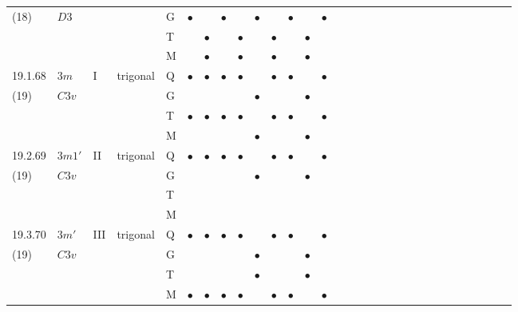 \documentclass[fleqn,9pt,landscape]{jsarticle}
\begin{document}
\begin{longtable}{lllll|l|l|l|l|l|l|l|l|l|ll|ll|ll|ll|ll|ll|ll|ll}
(18) & $D3$ &  &  & G & $\bullet$ &  & $\bullet$ &  & $\bullet$ &  & $\bullet$ &  & $\bullet$ &  &  &  &  &  &  &  &  &  &  &  &  &  &  &  &  \\
 &  &  &  & T &  & $\bullet$ &  & $\bullet$ &  & $\bullet$ &  & $\bullet$ &  &  &  &  &  &  &  &  &  &  &  &  &  &  &  &  &  \\
 &  &  &  & M &  & $\bullet$ &  & $\bullet$ &  & $\bullet$ &  & $\bullet$ &  &  &  &  &  &  &  &  &  &  &  &  &  &  &  &  &  \\ \hline
19.1.68 & \texttt{$3m$} & I & trigonal & Q & $\bullet$ & $\bullet$ & $\bullet$ & $\bullet$ &  & $\bullet$ & $\bullet$ &  & $\bullet$ &  &  &  &  &  &  &  &  &  &  &  &  &  &  &  &  \\
(19) & $C3v$ &  &  & G &  &  &  &  & $\bullet$ &  &  & $\bullet$ &  &  &  &  &  &  &  &  &  &  &  &  &  &  &  &  &  \\
 &  &  &  & T & $\bullet$ & $\bullet$ & $\bullet$ & $\bullet$ &  & $\bullet$ & $\bullet$ &  & $\bullet$ &  &  &  &  &  &  &  &  &  &  &  &  &  &  &  &  \\
 &  &  &  & M &  &  &  &  & $\bullet$ &  &  & $\bullet$ &  &  &  &  &  &  &  &  &  &  &  &  &  &  &  &  &  \\ \hline
19.2.69 & \texttt{$3m1'$} & II & trigonal & Q & $\bullet$ & $\bullet$ & $\bullet$ & $\bullet$ &  & $\bullet$ & $\bullet$ &  & $\bullet$ &  &  &  &  &  &  &  &  &  &  &  &  &  &  &  &  \\
(19) & $C3v$ &  &  & G &  &  &  &  & $\bullet$ &  &  & $\bullet$ &  &  &  &  &  &  &  &  &  &  &  &  &  &  &  &  &  \\
 &  &  &  & T &  &  &  &  &  &  &  &  &  &  &  &  &  &  &  &  &  &  &  &  &  &  &  &  &  \\
 &  &  &  & M &  &  &  &  &  &  &  &  &  &  &  &  &  &  &  &  &  &  &  &  &  &  &  &  &  \\ \hline
19.3.70 & \texttt{$3m'$} & III & trigonal & Q & $\bullet$ & $\bullet$ & $\bullet$ & $\bullet$ &  & $\bullet$ & $\bullet$ &  & $\bullet$ &  &  &  &  &  &  &  &  &  &  &  &  &  &  &  &  \\
(19) & $C3v$ &  &  & G &  &  &  &  & $\bullet$ &  &  & $\bullet$ &  &  &  &  &  &  &  &  &  &  &  &  &  &  &  &  &  \\
 &  &  &  & T &  &  &  &  & $\bullet$ &  &  & $\bullet$ &  &  &  &  &  &  &  &  &  &  &  &  &  &  &  &  &  \\
 &  &  &  & M & $\bullet$ & $\bullet$ & $\bullet$ & $\bullet$ &  & $\bullet$ & $\bullet$ &  & $\bullet$ &  &  &  &  &  &  &  &  &  &  &  &  &  &  &  &  \\ \hline

\end{longtable}
\end{document}
